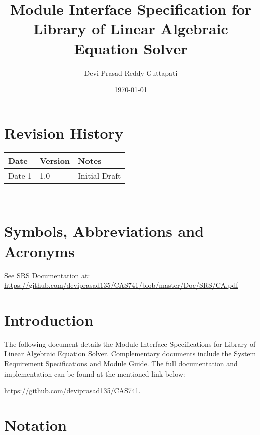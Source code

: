 \documentclass[12pt, titlepage]{article}
\begin{document}
\title{Module Interface Specification for Library of Linear Algebraic Equation Solver}

\author{Devi Prasad Reddy Guttapati}

\date{\today}

\maketitle


\section{Revision History}

\begin{tabularx}{\textwidth}{p{3cm}p{2cm}X}
\toprule {\bf Date} & {\bf Version} & {\bf Notes}\\
\midrule
Date 1 & 1.0 & Initial Draft\\

\bottomrule
\end{tabularx}

~\newpage

\section{Symbols, Abbreviations and Acronyms}

See SRS Documentation at:  \url{https://github.com/deviprasad135/CAS741/blob/master/Doc/SRS/CA.pdf}


\newpage

\tableofcontents

\newpage


\section{Introduction}

The following document details the Module Interface Specifications for Library of Linear Algebraic Equation Solver. 
Complementary documents include the System Requirement Specifications
and Module Guide.  The full documentation and implementation can be
found at the mentioned link below:

\url{https://github.com/deviprasad135/CAS741}.  

\section{Notation}
\end{document}
